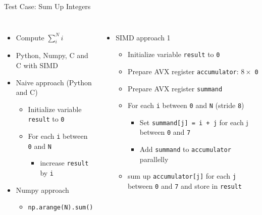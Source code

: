\begin{frame}{Test Case: Sum Up Integers}
%
\begin{columns}[T]
\begin{itemize}
\item Compute $\sum_i^N i$
\item Python, Numpy, C and C with SIMD
\item Naive approach (Python and C)
	\begin{itemize}
	\item Initialize variable \texttt{result} to \texttt{0}
	\item For each \texttt{i} between \texttt{0} and \texttt{N}
		\begin{itemize}
		\item increase \texttt{result} by \texttt{i}
		\end{itemize} 
	\end{itemize}
\item Numpy approach
	\begin{itemize}
	\item \texttt{np.arange(N).sum()}
	\end{itemize}
\end{itemize}
%
\begin{itemize}
\item SIMD approach 1
	\begin{itemize}
	\item Initialize variable \texttt{result} to \texttt{0}
	\item Prepare AVX register \texttt{accumulator}: $8\times$ \texttt{0}
	\item Prepare AVX register \texttt{summand}
	\item For each \texttt{i} between \texttt{0} and \texttt{N} (stride \texttt{8})
		\begin{itemize}
		\item Set \texttt{summand[j] = i + j} for each j between \texttt{0} and \texttt{7}
		\item Add \texttt{summand} to \texttt{accumulator} parallelly
		\end{itemize}
	\item sum up \texttt{accumulator[j]} for each \texttt{j} between \texttt{0} and \texttt{7} and store in \texttt{result}
	\end{itemize}
\end{itemize}
\end{columns}
%
\end{frame}

